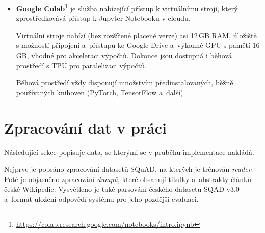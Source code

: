 \begin{itemize}
    \item \textbf{Google Colab}\footnote{\url{https://colab.research.google.com/notebooks/intro.ipynb}}
    je služba nabízející přístup k virtuálnímu stroji, který zprostředkovává přístup k Jupyter Notebooku v cloudu.\par 
    Virtuální stroje nabízí (bez rozšířené placené verze) asi 12\,GB RAM, úložiště s možností připojení a~přístupu ke Google Drive a~výkonné GPU s pamětí 16\,GB, vhodné pro akceleraci výpočtů. Dokonce jsou dostupná i běhová prostředí s TPU pro paralelizaci výpočtů.\par
    Běhová prostředí vždy disponují množstvím předinstalovaných, běžně používaných knihoven (PyTorch, TensorFlow a~další).
    
\end{itemize}

\section{Zpracování dat v práci}
\label{data_processing}
Následující sekce popisuje data, se kterými se v průběhu implementace nakládá. \par
Nejprve je popsáno zpracování datasetů SQuAD, na kterých je trénován \emph{reader}. Poté je objasněno zpracování \textit{dumpů}, které obsahují titulky a~abstrakty článků české Wikipedie. Vysvětleno je také parsování českého datasetu SQAD v3.0 a~formát uložení odpovědí systému pro jeho pozdější evaluaci. 

